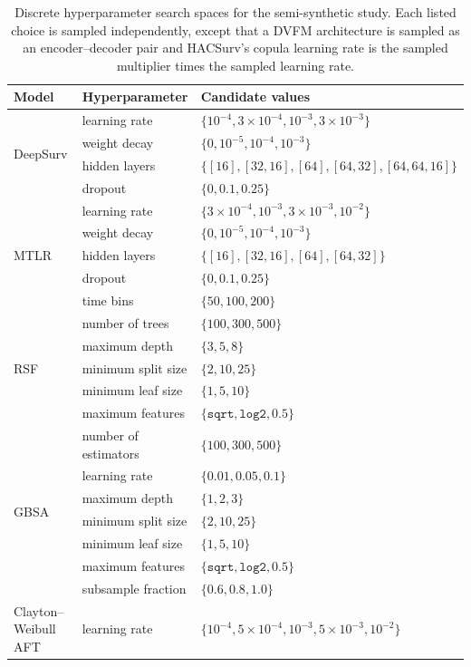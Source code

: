 \begin{table}[!ht]
\centering
\small
\caption{Discrete hyperparameter search spaces for the semi-synthetic study.
Each listed choice is sampled independently, except that a DVFM architecture
is sampled as an encoder--decoder pair and HACSurv's copula learning rate is
the sampled multiplier times the sampled learning rate.}
\label{tab:semi_synthetic_search_spaces}
\begin{tabular}{@{}llp{}@{}}
\toprule
Model & Hyperparameter & Candidate values \\
\midrule
\multirow{4}{*}{DeepSurv}
& learning rate & $\{10^{-4},3\!\times\!10^{-4},10^{-3},3\!\times\!10^{-3}\}$ \\
& weight decay & $\{0,10^{-5},10^{-4},10^{-3}\}$ \\
& hidden layers & $\{[16],[32,16],[64],[64,32],[64,64,16]\}$ \\
& dropout & $\{0,0.1,0.25\}$ \\
\midrule
\multirow{5}{*}{MTLR}
& learning rate & $\{3\!\times\!10^{-4},10^{-3},3\!\times\!10^{-3},10^{-2}\}$ \\
& weight decay & $\{0,10^{-5},10^{-4},10^{-3}\}$ \\
& hidden layers & $\{[16],[32,16],[64],[64,32]\}$ \\
& dropout & $\{0,0.1,0.25\}$ \\
& time bins & $\{50,100,200\}$ \\
\midrule
\multirow{5}{*}{RSF}
& number of trees & $\{100,300,500\}$ \\
& maximum depth & $\{3,5,8\}$ \\
& minimum split size & $\{2,10,25\}$ \\
& minimum leaf size & $\{1,5,10\}$ \\
& maximum features & $\{\texttt{sqrt},\texttt{log2},0.5\}$ \\
\midrule
\multirow{7}{*}{GBSA}
& number of estimators & $\{100,300,500\}$ \\
& learning rate & $\{0.01,0.05,0.1\}$ \\
& maximum depth & $\{1,2,3\}$ \\
& minimum split size & $\{2,10,25\}$ \\
& minimum leaf size & $\{1,5,10\}$ \\
& maximum features & $\{\texttt{sqrt},\texttt{log2},0.5\}$ \\
& subsample fraction & $\{0.6,0.8,1.0\}$ \\
\midrule
Clayton--Weibull AFT & learning rate & $\{10^{-4},5\!\times\!10^{-4},10^{-3},5\!\times\!10^{-3},10^{-2}\}$ \\

\end{tabular}
\end{table}
